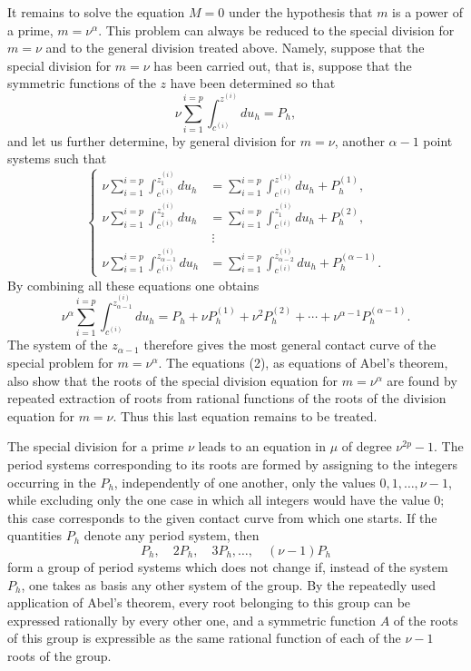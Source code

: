 \documentclass[10pt]{article}
\begin{document}
It remains to solve the equation \(M=0\) under the hypothesis that \(m\) is a power of a prime, \(m=\nu^\alpha\). This problem can always be reduced to the special division for \(m=\nu\) and to the general division treated above. Namely, suppose that the special division for \(m=\nu\) has been carried out, that is, suppose that the symmetric functions of the \(z\) have been determined so that
\[
\nu\sum_{i=1}^{i=p}\int_{c^{(i)}}^{z^{(i)}}du_h=P_h,
\]
and let us further determine, by general division for \(m=\nu\), another \(\alpha-1\) point systems such that
\[
\left\{
\begin{aligned}
\nu\sum_{i=1}^{i=p}\int_{c^{(i)}}^{z_1^{(i)}}du_h
&=
\sum_{i=1}^{i=p}\int_{c^{(i)}}^{z^{(i)}}du_h+P_h^{(1)},\\
\nu\sum_{i=1}^{i=p}\int_{c^{(i)}}^{z_2^{(i)}}du_h
&=
\sum_{i=1}^{i=p}\int_{c^{(i)}}^{z_1^{(i)}}du_h+P_h^{(2)},\\
&\ \vdots\\
\nu\sum_{i=1}^{i=p}\int_{c^{(i)}}^{z_{\alpha-1}^{(i)}}du_h
&=
\sum_{i=1}^{i=p}\int_{c^{(i)}}^{z_{\alpha-2}^{(i)}}du_h+P_h^{(\alpha-1)}.
\end{aligned}
\right.
\tag{2}
\]
By combining all these equations one obtains
\[
\nu^\alpha\sum_{i=1}^{i=p}\int_{c^{(i)}}^{z_{\alpha-1}^{(i)}}du_h
=
P_h+\nu P_h^{(1)}+\nu^2P_h^{(2)}+\cdots+\nu^{\alpha-1}P_h^{(\alpha-1)}.
\]
The system of the \(z_{\alpha-1}\) therefore gives the most general contact curve of the special problem for \(m=\nu^\alpha\). The equations (2), as equations of Abel's theorem, also show that the roots of the special division equation for \(m=\nu^\alpha\) are found by repeated extraction of roots from rational functions of the roots of the division equation for \(m=\nu\). Thus this last equation remains to be treated.

The special division for a prime \(\nu\) leads to an equation in \(\mu\) of degree \(\nu^{2p}-1\). The period systems corresponding to its roots are formed by assigning to the integers occurring in the \(P_h\), independently of one another, only the values \(0,1,\ldots,\nu-1\), while excluding only the one case in which all integers would have the value 0; this case corresponds to the given contact curve from which one starts. If the quantities \(P_h\) denote any period system, then
\[
P_h,\quad 2P_h,\quad 3P_h,\ldots,\quad(\nu-1)P_h
\]
form a group of period systems which does not change if, instead of the system \(P_h\), one takes as basis any other system of the group. By the repeatedly used application of Abel's theorem, every root belonging to this group can be expressed rationally by every other one, and a symmetric function \(A\) of the roots of this group is expressible as the same rational function of each of the \(\nu-1\) roots of the group.
\end{document}
